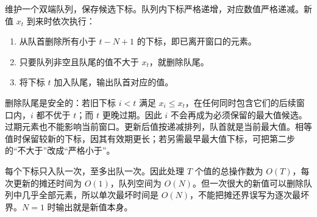 维护一个双端队列，保存候选下标。队列内下标严格递增，对应数值严格递减。新值 $x_t$ 到来时依次执行：
\begin{enumerate}
\item 从队首删除所有小于 $t-N+1$ 的下标，即已离开窗口的元素。
\item 只要队列非空且队尾的值不大于 $x_t$，就删除队尾。
\item 将下标 $t$ 加入队尾，输出队首对应的值。
\end{enumerate}
删除队尾是安全的：若旧下标 $i<t$ 满足 $x_i\le x_t$，在任何同时包含它们的后续窗口内，$i$ 都不优于 $t$；而 $t$ 更晚过期。因此 $i$ 不会再成为必须保留的最大值候选。过期元素也不能影响当前窗口。更新后值按递减排列，队首就是当前最大值。相等值时保留较新的下标，因其有效期更长；若另需最早最大值下标，可把第二步的“不大于”改成“严格小于”。

每个下标只入队一次，至多出队一次。因此处理 $T$ 个值的总操作数为 $O(T)$，每次更新的摊还时间为 $O(1)$，队列空间为 $O(N)$。但一次很大的新值可以删除队列中几乎全部元素，所以单次最坏时间是 $O(N)$，不能把摊还界误写为逐次最坏界。$N=1$ 时输出就是新值本身。
